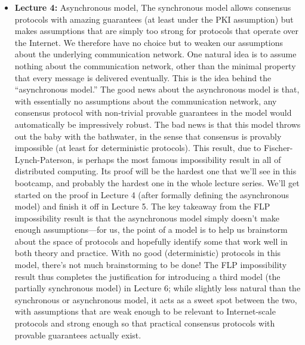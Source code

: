 \begin{itemize}
    \item \textbf{Lecture 4: }Asynchronous model, The synchronous model allows consensus protocols with amazing guarantees (at least under
the PKI assumption) but makes assumptions that are simply too strong for protocols that
operate over the Internet. We therefore have no choice but to weaken our assumptions about
the underlying communication network. One natural idea is to assume nothing about the
communication network, other than the minimal property that every message is delivered
eventually. This is the idea behind the “asynchronous model.”
The good news about the asynchronous model is that, with essentially no assumptions
about the communication network, any consensus protocol with non-trivial provable guarantees in the model would automatically be impressively robust. The bad news is that this
model throws out the baby with the bathwater, in the sense that consensus is provably impossible (at least for deterministic protocols). This result, due to Fischer-Lynch-Paterson,
is perhaps the most famous impossibility result in all of distributed computing. Its proof
will be the hardest one that we’ll see in this bootcamp, and probably the hardest one in the
whole lecture series. We’ll get started on the proof in Lecture 4 (after formally defining the
asynchronous model) and finish it off in Lecture 5.
The key takeaway from the FLP impossibility result is that the asynchronous model simply doesn’t make enough assumptions—for us, the point of a model is to help us brainstorm about the space of protocols and hopefully identify some that work well in both theory and
practice. With no good (deterministic) protocols in this model, there’s not much brainstorming to be done! The FLP impossibility result thus completes the justification for introducing
a third model (the partially synchronous model) in Lecture 6; while slightly less natural than
the synchronous or asynchronous model, it acts as a sweet spot between the two, with assumptions that are weak enough to be relevant to Internet-scale protocols and strong enough
so that practical consensus protocols with provable guarantees actually exist.


\end{itemize}
